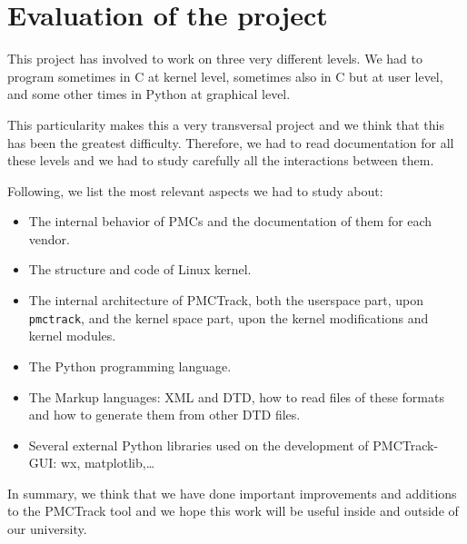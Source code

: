 \section{Evaluation of the project}

This project has involved to work on three very different levels. We had to program sometimes in C at kernel level, sometimes also in C but at user level, and some other times in Python at graphical level.

This particularity makes this a very transversal project and we think that this has been the greatest difficulty. Therefore, we had to read documentation for all these levels and we had to study carefully all the interactions between them.

Following, we list the most relevant aspects we had to study about:
\begin{itemize}
  \item The internal behavior of PMCs and the documentation of them for each vendor.
  \item The structure and code of Linux kernel.
  \item The internal architecture of PMCTrack, both the userspace part, upon \texttt{pmctrack}, and the kernel space part, upon the kernel modifications and kernel modules.
  \item The Python programming language.
  \item The Markup languages: XML and DTD, how to read files of these formats and how to generate them from other DTD files.
  \item Several external Python libraries used on the development of PMCTrack-GUI: wx, matplotlib,\ldots
\end{itemize}

In summary, we think that we have done important improvements and additions to the PMCTrack tool and we hope this work will be useful inside and outside of our university.

